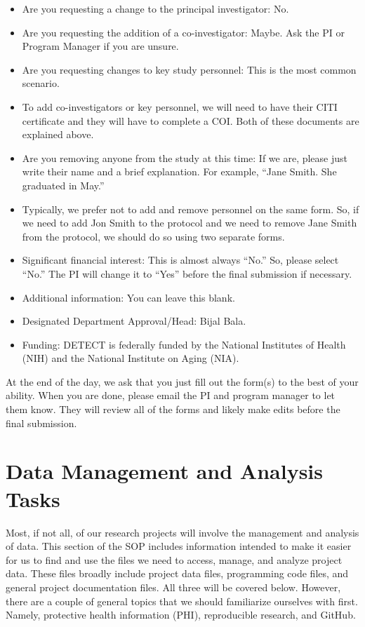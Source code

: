 \documentclass[
  letterpaper,
  DIV=11,
  numbers=noendperiod]{scrreprt}
\providecommand{\tightlist}{%
  \setlength{\itemsep}{0pt}\setlength{\parskip}{0pt}}\usepackage{longtable,booktabs,array}
\begin{document}
\begin{itemize}
\tightlist
\item
  Are you requesting a change to the principal investigator: No.~
\item
  Are you requesting the addition of a co-investigator: Maybe. Ask the
  PI or Program Manager if you are unsure.
\item
  Are you requesting changes to key study personnel: This is the most
  common scenario.
\item
  To add co-investigators or key personnel, we will need to have their
  CITI certificate and they will have to complete a COI. Both of these
  documents are explained above.
\item
  Are you removing anyone from the study at this time: If we are, please
  just write their name and a brief explanation. For example, ``Jane
  Smith. She graduated in May.''
\item
  Typically, we prefer not to add and remove personnel on the same form.
  So, if we need to add Jon Smith to the protocol and we need to remove
  Jane Smith from the protocol, we should do so using two separate
  forms.
\item
  Significant financial interest: This is almost always ``No.'' So,
  please select ``No.'' The PI will change it to ``Yes'' before the
  final submission if necessary.
\item
  Additional information: You can leave this blank.
\item
  Designated Department Approval/Head: Bijal Bala.
\item
  Funding: DETECT is federally funded by the National Institutes of
  Health (NIH) and the National Institute on Aging (NIA).
\end{itemize}

At the end of the day, we ask that you just fill out the form(s) to the
best of your ability. When you are done, please email the PI and program
manager to let them know. They will review all of the forms and likely
make edits before the final submission.

\chapter{Data Management and Analysis Tasks}\label{sec-data}

Most, if not all, of our research projects will involve the management
and analysis of data. This section of the SOP includes information
intended to make it easier for us to find and use the files we need to
access, manage, and analyze project data. These files broadly include
project data files, programming code files, and general project
documentation files. All three will be covered below. However, there are
a couple of general topics that we should familiarize ourselves with
first. Namely, protective health information (PHI), reproducible
research, and GitHub.
\end{document}
